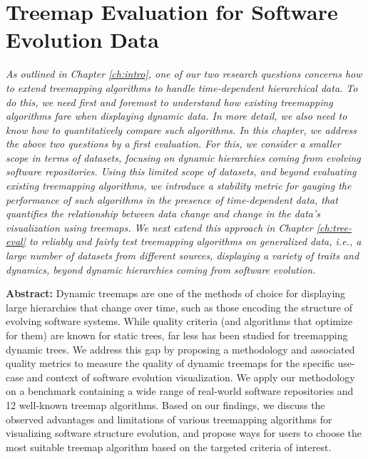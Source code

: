 \chapter{Treemap Evaluation for Software Evolution Data}
\label{ch:soft-eval}

\textit{
As outlined in Chapter \ref{ch:intro}, one of our two research questions concerns how to extend treemapping algorithms to handle time-dependent hierarchical data. To do this, we need first and foremost to understand how existing treemapping algorithms fare when displaying dynamic data. In more detail, we also need to know how to quantitatively compare such algorithms. In this chapter, we address the above two questions by a first evaluation. For this, we consider a smaller scope in terms of datasets, focusing on dynamic hierarchies coming from evolving software repositories. Using this limited scope of datasets, and beyond evaluating existing treemapping algorithms, we introduce a stability metric for gauging the performance of such algorithms in the presence of time-dependent data, that quantifies the relationship between data change and change in the data's visualization using treemaps. We next extend this approach in Chapter \ref{ch:tree-eval} to reliably and fairly test treemapping algorithms on generalized data, \emph{i.e.}, a large number of datasets from different sources, displaying a variety of traits and dynamics, beyond dynamic hierarchies coming from software evolution.}


\vspace{5mm} %

\noindent \textbf{Abstract:}
Dynamic treemaps are one of the methods of choice for displaying large hierarchies that change over time, such as those encoding the structure of evolving software systems. While quality criteria (and algorithms that optimize for them) are known for static trees, far less has been studied for treemapping dynamic trees. We address this gap by proposing a methodology and associated quality metrics to measure the quality of dynamic treemaps for the specific use-case and context of software evolution visualization. We apply our methodology on a benchmark containing a wide range of real-world software repositories and 12 well-known treemap algorithms. Based on our findings, we discuss the observed advantages and limitations of various treemapping algorithms for visualizing software structure evolution, and propose ways for users to choose the most suitable treemap algorithm based on the targeted criteria of interest.

